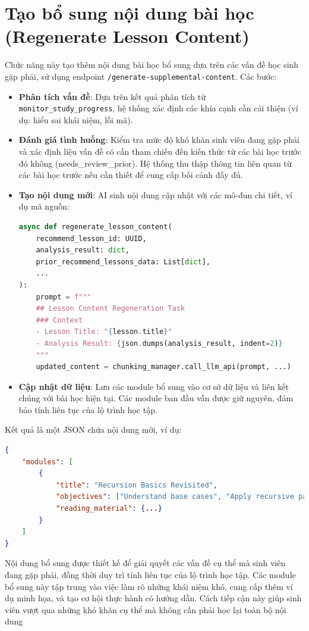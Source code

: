 \section{Tạo bổ sung nội dung bài học (Regenerate Lesson Content)}
Chức năng này tạo thêm nội dung bài học bổ sung dựa trên các vấn đề học sinh gặp phải, sử dụng endpoint \texttt{/generate-supplemental-content}. Các bước:
\begin{itemize}
    \item \textbf{Phân tích vấn đề}: Dựa trên kết quả phân tích từ \texttt{monitor\_study\_progress}, hệ thống xác định các khía cạnh cần cải thiện (ví dụ: hiểu sai khái niệm, lỗi mã).
    \item \textbf{Đánh giá tình huống}: Kiểm tra mức độ khó khăn sinh viên đang gặp phải và xác định liệu vấn đề có cần tham chiếu đến kiến thức từ các bài học trước đó không (needs\_review\_prior). Hệ thống thu thập thông tin liên quan từ các bài học trước nếu cần thiết để cung cấp bối cảnh đầy đủ.
    \item \textbf{Tạo nội dung mới}: AI sinh nội dung cập nhật với các mô-đun chi tiết, ví dụ mã nguồn:
    \begin{lstlisting}[language=Python]
async def regenerate_lesson_content(
    recommend_lesson_id: UUID,
    analysis_result: dict,
    prior_recommend_lessons_data: List[dict],
    ...
):
    prompt = f"""
    ## Lesson Content Regeneration Task
    ### Context
    - Lesson Title: "{lesson.title}"
    - Analysis Result: {json.dumps(analysis_result, indent=2)}
    """
    updated_content = chunking_manager.call_llm_api(prompt, ...)
    \end{lstlisting}
    \item \textbf{Cập nhật dữ liệu}: Lưu các module bổ sung vào cơ sở dữ liệu và liên kết chúng với bài học hiện tại. Các module ban đầu vẫn được giữ nguyên, đảm bảo tính liên tục của lộ trình học tập.
\end{itemize}

Kết quả là một JSON chứa nội dung mới, ví dụ:
\begin{lstlisting}[language=JSON]
{
    "modules": [
        {
            "title": "Recursion Basics Revisited",
            "objectives": ["Understand base cases", "Apply recursive patterns"],
            "reading_material": {...}
        }
    ]
}
\end{lstlisting}
Nội dung bổ sung được thiết kế để giải quyết các vấn đề cụ thể mà sinh viên đang gặp phải, đồng thời duy trì tính liên tục của lộ trình học tập. Các module bổ sung này tập trung vào việc làm rõ những khái niệm khó, cung cấp thêm ví dụ minh họa, và tạo cơ hội thực hành có hướng dẫn. Cách tiếp cận này giúp sinh viên vượt qua những khó khăn cụ thể mà không cần phải học lại toàn bộ nội dung
